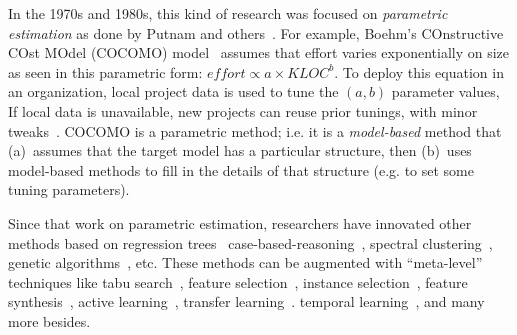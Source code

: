 \documentclass[smallcondesed]{svjour3}
\begin{document}
In the 1970s and 1980s, this kind of research was focused on
{\em parametric estimation} as done 
by Putnam and
others~\cite{wol74,frei79,black77,herd77,watson77,boehm81}. For example, Boehm's
COnstructive COst MOdel (COCOMO)
model~\cite{boehm81} 
 assumes  that effort varies exponentially on size as seen in this parametric form:
$\mathit{effort} \propto \mathit{a \times KLOC}^b$. To deploy this equation in an organization,
local project data is used to tune the  $(a,b)$ parameter values, If local
data is unavailable, new projects can reuse prior tunings,  with  minor
tweaks~\cite{me04h}. 
COCOMO is a parametric method; i.e. it is a 
{\em model-based} method that (a)~assumes that the target model has a particular structure,
then (b)~uses model-based methods to fill in the details of that structure (e.g. to set some tuning parameters).

 

  


Since that work on parametric estimation, researchers
have innovated other methods based on
regression
trees~\cite{shepperd97}
case-based-reasoning~\cite{shepperd97}, spectral
clustering~\cite{me12d}, genetic
algorithms~\cite{cordero97,burgess01}, etc.  These methods
can be augmented with  ``meta-level'' techniques like tabu search~\cite{cora10}, feature selection~\cite{chen05}, instance selection~\cite{koc11b},
feature synthesis~\cite{me12a}, active learning~\cite{me13a}, transfer learning~\cite{kocaguneli2014transfer}.
temporal learning~\cite{lokan09,minku14}, and many more besides.


 
\end{document}

